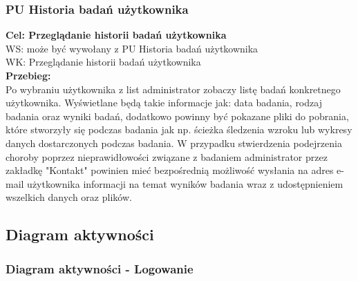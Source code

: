 \documentclass[12pt, letterpaper]{article}
\begin{document}
		
		\subsubsection{PU Historia badań użytkownika}
		
		\quad
		
		\textbf{Cel: Przeglądanie historii badań użytkownika}\\
		
		WS: może być wywołany z PU Historia badań użytkownika\\
		
		WK: Przeglądanie historii badań użytkownika \\
		
		\textbf{Przebieg:}\\
		Po wybraniu użytkownika z list administrator zobaczy listę badań konkretnego użytkownika. Wyświetlane będą takie informacje jak: data badania, rodzaj badania oraz wyniki badań, dodatkowo powinny być pokazane pliki do pobrania, które stworzyły się podczas badania jak np. ścieżka śledzenia wzroku lub wykresy danych dostarczonych podczas badania. W przypadku stwierdzenia podejrzenia choroby poprzez nieprawidłowości związane z badaniem administrator przez zakładkę "Kontakt" powinien mieć bezpośrednią możliwość wysłania na adres e-mail użytkownika informacji na temat wyników badania wraz z udostępnieniem wszelkich danych oraz plików.
		

		

		\subsection{Diagram aktywności}
		
		\subsubsection{Diagram aktywności - Logowanie}
		
\end{document}
